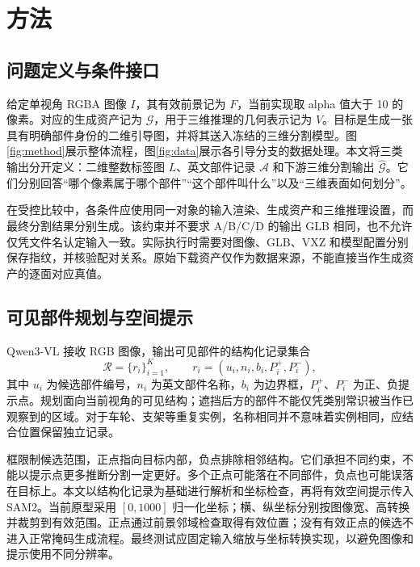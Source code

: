 \section{方法}
\label{sec:method}

\subsection{问题定义与条件接口}
给定单视角 RGBA 图像 $I$，其有效前景记为 $F$，当前实现取 alpha 值大于 10 的像素。对应的生成资产记为 $\mathcal{G}$，用于三维推理的几何表示记为 $V$。目标是生成一张具有明确部件身份的二维引导图，并将其送入冻结的三维分割模型。图\ref{fig:method}展示整体流程，图\ref{fig:data}展示各引导分支的数据处理。本文将三类输出分开定义：二维整数标签图 $L$、英文部件记录 $\mathcal{A}$ 和下游三维分割输出 $\widehat{\mathcal{G}}$。它们分别回答“哪个像素属于哪个部件”“这个部件叫什么”以及“三维表面如何划分”。

在受控比较中，各条件应使用同一对象的输入渲染、生成资产和三维推理设置，而最终分割结果分别生成。该约束并不要求 A/B/C/D 的输出 GLB 相同，也不允许仅凭文件名认定输入一致。实际执行时需要对图像、GLB、VXZ 和模型配置分别保存指纹，并核验配对关系。原始下载资产仅作为数据来源，不能直接当作生成资产的逐面对应真值。



\subsection{可见部件规划与空间提示}
Qwen3-VL 接收 RGB 图像，输出可见部件的结构化记录集合
\begin{equation}
 \mathcal{R}=\{r_i\}_{i=1}^{K},\qquad
 r_i=(u_i,n_i,b_i,P_i^+,P_i^-),
 \label{eq:records}
\end{equation}
其中 $u_i$ 为候选部件编号，$n_i$ 为英文部件名称，$b_i$ 为边界框，$P_i^+$、$P_i^-$ 为正、负提示点。规划面向当前视角的可见结构；遮挡后方的部件不能仅凭类别常识被当作已观察到的区域。对于车轮、支架等重复实例，名称相同并不意味着实例相同，应结合位置保留独立记录。

框限制候选范围，正点指向目标内部，负点排除相邻结构。它们承担不同约束，不能以提示点更多推断分割一定更好。多个正点可能落在不同部件，负点也可能误落在目标上。本文以结构化记录为基础进行解析和坐标检查，再将有效空间提示传入 SAM2。当前原型采用 $[0,1000]$ 归一化坐标；横、纵坐标分别按图像宽、高转换并裁剪到有效范围。正点通过前景邻域检查取得有效位置；没有有效正点的候选不进入正常掩码生成流程。最终测试应固定输入缩放与坐标转换实现，以避免图像和提示使用不同分辨率。

